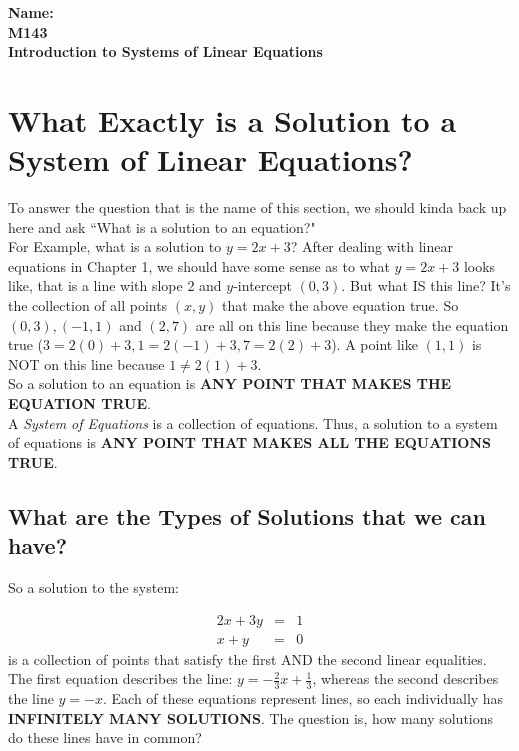 \documentclass[10pt]{article}
\theoremstyle{definition}
\begin{document}
%

{\bf Name:} \hrulefill\hrulefill\hrulefill\\
{\bf M143} \qquad \qquad \\
{\bf Introduction to Systems of Linear Equations }\\ %



\section{What Exactly is  a Solution to a System of Linear Equations?}

To answer the question that is the name of this section, we should kinda back up here and ask ``What is a solution to an equation?"\\

For Example, what is a solution to $y=2x+3$? After dealing with linear equations in Chapter 1, we should have some sense as to what $y=2x+3$ looks like, that is a line with slope 2 and $y$-intercept $(0,3)$.  But what IS this line?  It's the collection of all points $(x,y)$ that make the above equation true.  So $(0,3), (-1,1)$ and $(2,7)$ are all on this line because they make the equation true ($3=2(0)+3, 1=2(-1)+3, 7=2(2)+3$).  A point like $(1,1)$ is NOT on this line because $1\neq 2(1)+3$.  \\

So a solution to an equation is \textbf{ANY POINT THAT MAKES THE EQUATION TRUE}.\\

A \textit{System of Equations} is a collection of equations.  Thus, a solution to a system of equations is \textbf{ANY POINT THAT MAKES ALL THE EQUATIONS TRUE}.

\subsection{What are the Types of Solutions that we can have?}

So a solution to the system:

\begin{eqnarray*}
2x+3y&=&1\\
x+y&=&0
\end{eqnarray*}
is a collection of points that satisfy the first AND the second linear equalities.  The first equation describes the line: $y=-\frac{2}{3}x+\frac{1}{3}$, whereas the second describes the line $y=-x$.  Each of these equations represent lines, so each individually has \textbf{INFINITELY MANY SOLUTIONS}.  The question is, how many solutions do these lines have in common?\\
\end{document}
